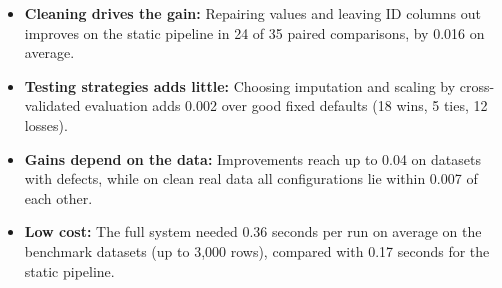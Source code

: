 \documentclass[11pt,a4paper]{article}
\begin{document}
\begin{itemize}
    \item \textbf{Cleaning drives the gain:} Repairing values and leaving ID columns out improves on the static pipeline in 24 of 35 paired comparisons, by 0.016 on average.
    \item \textbf{Testing strategies adds little:} Choosing imputation and scaling by cross-validated evaluation adds 0.002 over good fixed defaults (18 wins, 5 ties, 12 losses).
    \item \textbf{Gains depend on the data:} Improvements reach up to 0.04 on datasets with defects, while on clean real data all configurations lie within 0.007 of each other.
    \item \textbf{Low cost:} The full system needed 0.36 seconds per run on average on the benchmark datasets (up to 3,000 rows), compared with 0.17 seconds for the static pipeline.
\end{itemize}
\end{document}
